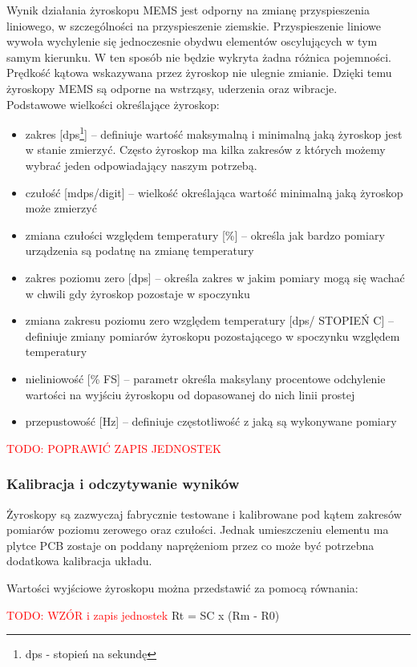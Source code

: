 Wynik działania żyroskopu MEMS jest odporny na zmianę przyspieszenia liniowego, w szczególności na przyspieszenie ziemskie.
Przyspieszenie liniowe wywoła wychylenie się jednoczesnie obydwu elementów oscylujących w tym samym kierunku. W ten sposób
nie będzie wykryta żadna różnica pojemności. Prędkość kątowa wskazywana przez żyroskop nie ulegnie zmianie. Dzięki temu
żyroskopy MEMS są odporne na wstrząsy, uderzenia oraz wibracje.
\\
Podstawowe wielkości określające żyroskop:
\begin{itemize}
 \item zakres [dps\footnote{dps - stopień na sekundę}] -- definiuje wartość maksymalną i minimalną jaką żyroskop jest w stanie
 zmierzyć. Często żyroskop ma kilka zakresów z których możemy wybrać jeden odpowiadający naszym potrzebą.
 \item czułość [mdps/digit] -- wielkość określająca wartość minimalną jaką żyroskop może zmierzyć
 \item zmiana czułości względem temperatury [\%] -- określa jak bardzo pomiary urządzenia są podatnę na zmianę temperatury
 \item zakres poziomu zero [dps] -- określa zakres w jakim pomiary mogą się wachać w chwili gdy żyroskop pozostaje w spoczynku
 \item zmiana zakresu poziomu zero względem temperatury [dps/ STOPIEŃ C] -- definiuje zmiany pomiarów żyroskopu pozostającego w spoczynku
 względem temperatury
 \item nieliniowość [\% FS] -- parametr określa maksylany procentowe odchylenie wartości na wyjściu żyroskopu od dopasowanej do nich linii prostej
 \item przepustowość [Hz] -- definiuje częstotliwość z jaką są wykonywane pomiary
\end{itemize}
\textcolor{red}{TODO: POPRAWIĆ ZAPIS JEDNOSTEK}

\subsubsection{Kalibracja i odczytywanie wyników}
Żyroskopy są zazwyczaj fabrycznie testowane i kalibrowane pod kątem zakresów pomiarów poziomu zerowego oraz czułości. 
Jednak umieszczeniu elementu ma plytce PCB zostaje on poddany naprężeniom przez co może być potrzebna dodatkowa kalibracja układu.

Wartości wyjściowe żyroskopu można przedstawić za pomocą równania:

\textcolor{red}{TODO: WZÓR i zapis jednostek} Rt = SC x (Rm - R0) 

